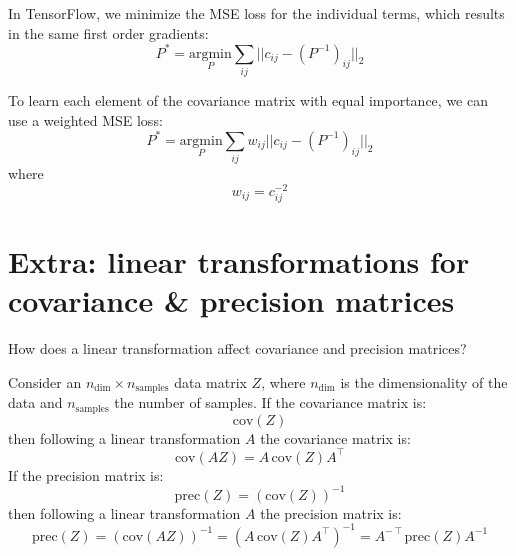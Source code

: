 \documentclass[11pt]{article}
\begin{document}
In TensorFlow, we minimize the MSE loss for the individual terms, which results in the same first order gradients:
\begin{equation}
P^* = \underset{P}{\text{argmin}} \sum_{ij} \Big | \Big | c_{ij} - (P^{-1})_{ij} \Big | \Big |_2
\end{equation}

To learn each element of the covariance matrix with equal importance, we can use a weighted MSE loss:
\begin{equation}
P^* = \underset{P}{\text{argmin}} \sum_{ij} w_{ij} \Big | \Big | c_{ij} - (P^{-1})_{ij} \Big | \Big |_2
\end{equation}
where
\begin{equation}
w_{ij} = c_{ij}^{-2}
\end{equation}


\section{Extra: linear transformations for covariance \& precision matrices}


How does a linear transformation affect covariance and precision matrices?

Consider an $n_\text{dim} \times n_\text{samples}$ data matrix $Z$, where $n_\text{dim}$ is the dimensionality of the data and $n_\text{samples}$ the number of samples. If the covariance matrix is:
\begin{equation}
\text{cov}(Z)
\end{equation}
then following a linear transformation $A$ the covariance matrix is:
\begin{equation}
\text{cov}(AZ) = A \, \text{cov}(Z) A^\intercal
\end{equation}
If the precision matrix is:
\begin{equation}
\text{prec}(Z) = ( \text{cov}(Z) )^{-1}
\end{equation}
then following a linear transformation $A$ the precision matrix is:
\begin{equation}
\text{prec}(Z) = ( \text{cov}(AZ) )^{-1} = ( A \, \text{cov}(Z) A^\intercal )^{-1} = A^{-\intercal} \text{prec}(Z) A^{-1}
\end{equation}
\end{document}
